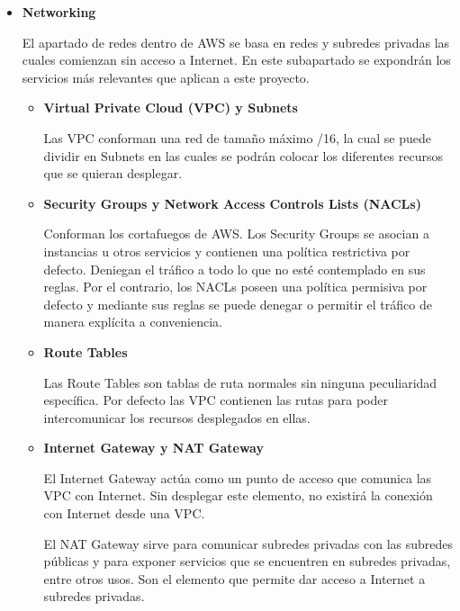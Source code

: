 \documentclass[../../memoria.tex]{subfiles}
\begin{document}
\begin{itemize}
      \item \textbf{Networking}
            \par
            El apartado de redes dentro de AWS se basa en redes y subredes privadas las cuales comienzan sin acceso a Internet. En este subapartado se expondrán los servicios más relevantes que aplican a este proyecto.
            \begin{itemize}
                  \item \textbf{Virtual Private Cloud (VPC) y Subnets}
                        \par
                        Las VPC conforman una red de tamaño máximo /16, la cual se puede dividir en Subnets en las cuales se podrán colocar los diferentes recursos que se quieran desplegar.
                  \item \textbf{Security Groups y Network Access Controls Lists (NACLs)}
                        \par
                        Conforman los cortafuegos de AWS. Los Security Groups se asocian a instancias u otros servicios y contienen una política restrictiva por defecto. Deniegan el tráfico a todo lo que no esté contemplado en sus reglas. Por el contrario, los NACLs poseen una política permisiva por defecto y mediante sus reglas se puede denegar o permitir el tráfico de manera explícita a conveniencia.
                  \item \textbf{Route Tables }
                        \par
                        Las Route Tables son tablas de ruta normales sin ninguna peculiaridad específica. Por defecto las VPC contienen las rutas para poder intercomunicar los recursos desplegados en ellas.
                  \item \textbf{Internet Gateway y NAT Gateway }
                        \par
                        El Internet Gateway actúa como un punto de acceso que comunica las VPC con Internet. Sin desplegar este elemento, no existirá la conexión con Internet desde una VPC.

                        El NAT Gateway sirve para comunicar subredes privadas con las subredes públicas y para exponer servicios que se encuentren en subredes privadas, entre otros usos. Son el elemento que permite dar acceso a Internet a subredes privadas.
            \end{itemize}


\end{itemize}
\end{document}
